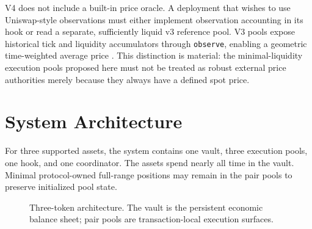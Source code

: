 \documentclass[11pt]{article}
\begin{document}
V4 does not include a built-in price oracle. A deployment that wishes to use
Uniswap-style observations must either implement observation accounting in its
hook or read a separate, sufficiently liquid v3 reference pool. V3 pools expose
historical tick and liquidity accumulators through \texttt{observe}, enabling a
geometric time-weighted average price \cite{univ3oracle,univ3whitepaper}. This
distinction is material: the minimal-liquidity execution pools proposed here
must not be treated as robust external price authorities merely because they
always have a defined spot price.

\section{System Architecture}

For three supported assets, the system contains one vault, three execution
pools, one hook, and one coordinator. The assets spend nearly all time in the
vault. Minimal protocol-owned full-range positions may remain in the pair pools
to preserve initialized pool state.

\begin{figure}[ht]
\centering
{}
\caption{Three-token architecture. The vault is the persistent economic
balance sheet; pair pools are transaction-local execution surfaces.}
\label{fig:architecture}
\end{figure}
\end{document}
